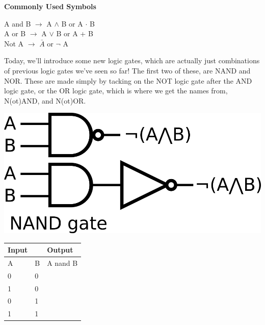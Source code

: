 \vspace{10mm}
\begin{center}
	\Large
	\textbf{Commonly Used Symbols}
	\normalsize
	
	A and B $\rightarrow$ A $\wedge$ B or A $\cdot$ B\\
	A or B $\rightarrow$ A $\vee $ B or A + B\\
	Not A $\rightarrow$ $\bar{A}$ or $\neg$ A\\
\end{center}

\newpage
Today, we'll introduce some new logic gates, which are actually just combinations of previous logic gates we've seen so far! The first
two of these, are NAND and NOR. These are made simply by tacking on the NOT logic gate after the AND logic gate, or the OR logic gate,
which is where we get the names from, N(ot)AND, and N(ot)OR.\\
\vspace{20mm}
\hspace{1in}
\begin{minipage}{.5\linewidth}
    \includegraphics[width=3 in]{images/nand_diagram.png}
\end{minipage}
\begin{minipage}{\linewidth}
    \begin{tabular}{|ll|l|}
        \hline
        Input                   &   & Output  \\ \hline
        \multicolumn{1}{|l|}{A} & B & A nand B \\ \hline
        \multicolumn{1}{|l|}{0} & 0 &        \\ \hline
        \multicolumn{1}{|l|}{1} & 0 &        \\ \hline
        \multicolumn{1}{|l|}{0} & 1 &        \\ \hline
        \multicolumn{1}{|l|}{1} & 1 &        \\ \hline
    \end{tabular}
\end{minipage}\\
\vspace{20mm}
\hspace{1in}
